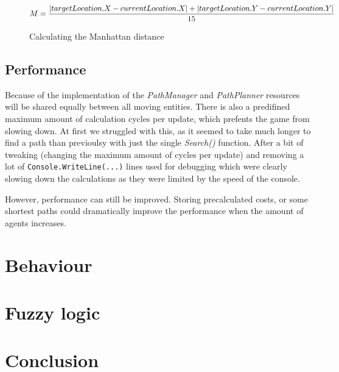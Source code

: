 \documentclass[11pt]{article}
\begin{document}
    \begin{figure}[h!]

        \[ $$M = \dfrac{|targetLocation.X - currentLocation.X| + |targetLocation.Y - currentLocation.Y|}{15}\]

        \caption{Calculating the Manhattan distance}

        \label{fig:pathPlanCalcManhattan}

    \end{figure}
    
    
    \subsection{Performance}\label{subsec:pathperformance}
    Because of the implementation of the \textit{PathManager} and \textit{PathPlanner} resources will be shared equally between all moving entities.
    There is also a predifined maximum amount of calculation cycles per update, which prefents the game from slowing down.
    At first we struggled with this, as it seemed to take much longer to find a path than previoulsy with just the single \textit{Search()} function.
    After a bit of tweaking (changing the maximum amount of cycles per update) and removing a lot of \lstinline[columns=fixed]{Console.WriteLine(...)}
    lines used for debugging which were clearly slowing down the calculations as they were limited by the speed of the console.\par
    
    However, performance can still be improved.
    Storing precalculated costs, or some shortest paths could dramatically improve the performance when the amount of agents increases.
    
    \newpage
    \section{Behaviour}\label{sec:behaviour}
    
    \newpage
    \section{Fuzzy logic}\label{sec:fuzzyLogic}

    \newpage
    \section{Conclusion}\label{sec:conclusion}

    \newpage

    
    
\end{document}
